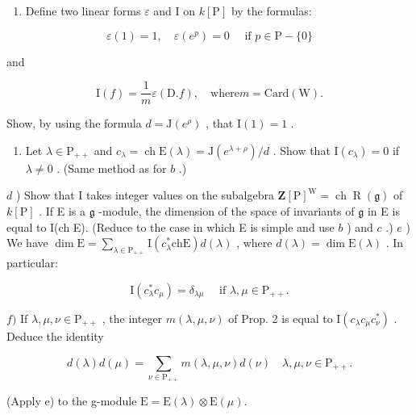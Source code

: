 \begin{enumerate}
\def\labelenumi{\alph{enumi})}
\setcounter{enumi}{1}
\tightlist
\item
  Define two linear forms \(\varepsilon\) and I on \(k[\mathrm{P}]\) by the formulas:
\end{enumerate}

\[
\varepsilon (1) = 1, \quad \varepsilon (e ^ {p}) = 0 \quad \text { if } p \in \mathrm{P} - \{0 \}
\]

and

\[
\mathrm{I} (f) = \frac {1}{m} \varepsilon (\mathrm{D}. f), \quad \mathrm{where} m = \mathrm{Card} (\mathrm{W}).
\]

Show, by using the formula \(d = \mathrm{J}(e^{\rho})\) , that \(\mathrm{I}(1) = 1\) .

\begin{enumerate}
\def\labelenumi{\alph{enumi})}
\setcounter{enumi}{2}
\tightlist
\item
  Let \(\lambda \in \mathrm{P}_{++}\) and \(c_{\lambda} = \operatorname{ch} \mathrm{E}(\lambda) = \mathrm{J}(e^{\lambda + \rho}) / d\) . Show that \(\mathrm{I}(c_{\lambda}) = 0\) if \(\lambda \neq 0\) . (Same method as for \(b\) .)
\end{enumerate}

\(d\) ) Show that I takes integer values on the subalgebra \(\mathbf{Z}[\mathrm{P}]^{\mathrm{W}} = \operatorname {ch}\operatorname {R}(\mathfrak{g})\) of \(k[\mathrm{P}]\) . If E is a \(\mathfrak{g}\) -module, the dimension of the space of invariants of \(\mathfrak{g}\) in E is equal to I(ch E). (Reduce to the case in which E is simple and use \(b\) ) and \(c\) .) \(e\) ) We have \(\dim \mathrm{E} = \sum_{\lambda \in \mathrm{P}_{++}}\mathrm{I}(c_\lambda^*\mathrm{ch}\mathrm{E})d(\lambda)\) , where \(d(\lambda) = \dim \mathrm{E}(\lambda)\) . In particular:

\[
\mathrm{I} (c _ {\lambda} ^ {*} c _ {\mu}) = \delta_ {\lambda \mu} \quad \text { if } \lambda , \mu \in \mathrm{P} _ {+ +}.
\]

\(f)\) If \(\lambda, \mu, \nu \in \mathrm{P}_{++}\) , the integer \(m(\lambda, \mu, \nu)\) of Prop. 2 is equal to \(\mathrm{I}(c_{\lambda} c_{\mu} c_{\nu}^{*})\) . Deduce the identity

\[
d (\lambda) d (\mu) = \sum_ {\nu \in \mathrm{P} _ {+ +}} m (\lambda , \mu , \nu) d (\nu) \quad \lambda , \mu , \nu \in \mathrm{P} _ {+ +}.
\]

(Apply e) to the g-module \(\mathrm{E} = \mathrm{E}(\lambda) \otimes \mathrm{E}(\mu).\)

